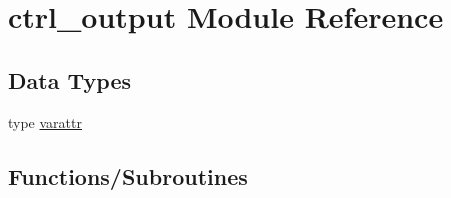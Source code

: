 \hypertarget{namespacectrl__output}{}\section{ctrl\+\_\+output Module Reference}
\label{namespacectrl__output}
\subsection*{Data Types}
\begin{DoxyCompactItemize}
\item 
type \hyperlink{structctrl__output_1_1varattr}{varattr}
\end{DoxyCompactItemize}
\subsection*{Functions/\+Subroutines}
